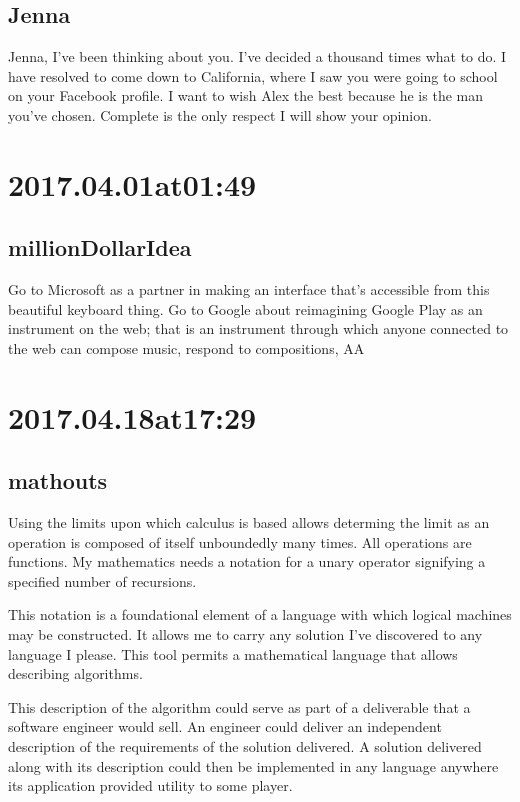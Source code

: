 \subsection*{ Jenna }
Jenna, I've been thinking about you.
I've decided a thousand times what to do.
I have resolved to come down to California, where I saw you were going to school on your Facebook profile.
I want to wish Alex the best because he is the man you've chosen.
Complete is the only respect I will show your opinion.

\section*{ 2017.04.01at01:49 }
\subsection*{ millionDollarIdea }
Go to Microsoft as a partner in making an interface that's accessible from this beautiful keyboard thing.
Go to Google about reimagining Google Play as an instrument on the web;
that is an instrument through which anyone connected to the web can compose music, respond to compositions, AA

\section*{ 2017.04.18at17:29 }
\subsection*{ mathouts }
Using the limits upon which calculus is based allows determing the limit as an operation is composed of itself unboundedly many times.
All operations are functions.
My mathematics needs a notation for a unary operator signifying a specified number of recursions.

This notation is a foundational element of a language with which logical machines may be constructed.
It allows me to carry any solution I've discovered to any language I please.
This tool permits a mathematical language that allows describing algorithms.

This description of the algorithm could serve as part of a deliverable that a software engineer would sell.
An engineer could deliver an independent description of the requirements of the solution delivered.
A solution delivered along with its description could then be implemented in any language anywhere its application provided utility to some player.

